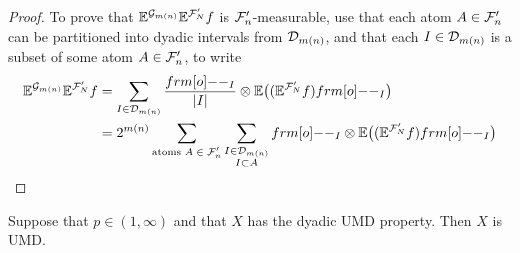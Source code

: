 \begin{proof}
  To prove that $\mathbb{E}^{\mathcal{G}_{m(n)}} \mathbb{E}^{\mathcal{F}_{N}'} f$ is $\mathcal{F}_{n}'$-measurable, use that each atom $A \in \mathcal{F}_{n}'$ can be partitioned into dyadic intervals from $\mathcal{D}_{m(n)}$, and that each $I \in \mathcal{D}_{m(n)}$ is a subset of some atom $A \in \mathcal{F}_{n}'$, to write
  \begin{equation*}
    \begin{aligned}
      \E^{\mc{G}_{m(n)}} \E^{\mc{F}_{N}'} f
      &= \sum_{I \in \mc{D}_{m(n)}} \frac{\1_{I}}{|I|} \otimes \E\big( (\E^{\mc{F}_{N}'} f) \1_{I} \big) \\
      &= 2^{m(n)} \sum_{\text{atoms $A \in \mc{F}_{n}'$}} \sum_{\substack{I \in \mc{D}_{m(n)} \\ I \subset A}} \1_{I} \otimes \E\big( (\E^{\mc{F}_{N}'} f) \1_{I} \big) 
    \end{aligned}
  \end{equation*}
\end{proof}

\begin{thm}\label{thm:dyadic-UMD}
  Suppose that $p \in (1,\infty)$ and that $X$ has the dyadic UMD property.
  Then $X$ is UMD.
\end{thm}

